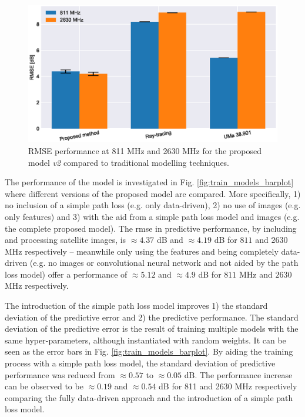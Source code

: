 \begin{figure}
    \centering
    \includegraphics{chapters/part_pathloss/model_aided_paper/model_comparison_bar_group_std_split.eps}
    \caption{RMSE performance at 811 MHz and 2630 MHz for the proposed model \emph{v2} compared to traditional modelling techniques.}
    \label{fig:model_comparison_bar_group}
\end{figure}

The performance of the model is investigated in Fig. \ref{fig:train_models_barplot} where different versions of the proposed model are compared. More specifically, 1) no inclusion of a simple path loss (e.g. only data-driven), 2) no use of images (e.g. only features) and 3) with the aid from a simple path loss model and images (e.g. the complete proposed model). The \gls{rmse} in predictive performance, by including and processing satellite images, is  $\approx 4.37$ dB and $\approx 4.19 $ dB for $811$ and $2630$ MHz respectively  -- meanwhile only using the features and being completely data-driven (e.g. no images or convolutional neural network and not aided by the path loss model) offer a performance of $\approx 5.12$ and $\approx 4.9$ dB for $811$ MHz and $2630$ MHz respectively. 

The introduction of the simple path loss model improves 1) the standard deviation of the predictive error and 2) the predictive performance. The standard deviation of the predictive error is the result of training multiple models with the same hyper-parameters, although instantiated with random weights. It can be seen as the error bars in Fig. \ref{fig:train_models_barplot}. By aiding the training process with a simple path loss model, the standard deviation of predictive performance was reduced from $\approx 0.57$ to $\approx 0.05$ dB. The performance increase can be observed to be $\approx 0.19$ and $\approx 0.54$ dB for 811 and 2630 MHz respectively comparing the fully data-driven approach and the introduction of a simple path loss model. 

